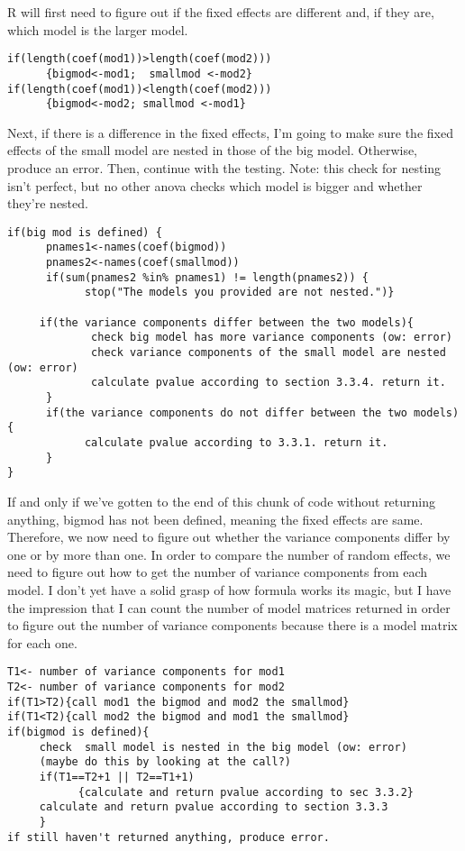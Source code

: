 \documentclass{article}
\begin{document}
 R will first need to figure out if the fixed effects are different and, if they are, which model is the larger model.
\begin{verbatim}
if(length(coef(mod1))>length(coef(mod2)))
      {bigmod<-mod1;  smallmod <-mod2} 
if(length(coef(mod1))<length(coef(mod2)))
      {bigmod<-mod2; smallmod <-mod1}
\end{verbatim}
Next, if there is a difference in the fixed effects, I'm going to make sure the fixed effects of the small model are nested in those of the big model. Otherwise, produce an error. Then, continue with the testing. Note: this check for nesting isn't perfect, but no other anova checks which model is bigger and whether they're nested.
\begin{verbatim}
if(big mod is defined) {
      pnames1<-names(coef(bigmod))
      pnames2<-names(coef(smallmod))
      if(sum(pnames2 %in% pnames1) != length(pnames2)) {
            stop("The models you provided are not nested.")}

     if(the variance components differ between the two models){
             check big model has more variance components (ow: error)
             check variance components of the small model are nested (ow: error)
             calculate pvalue according to section 3.3.4. return it.
      }
      if(the variance components do not differ between the two models){
            calculate pvalue according to 3.3.1. return it.
      }
}
\end{verbatim}
If and only if we've gotten to the end of this chunk of code without returning anything, bigmod has not been defined, meaning the fixed effects are same. Therefore, we now need to figure out whether the variance components differ by one or by more than one. In order to compare the number of random effects, we need to figure out how to get the number of variance components from each model. I  don't yet have a solid grasp of how formula works its magic, but I have the impression that I can count the number of model matrices returned in order to figure out the number of variance components because there is a model matrix for each one.

\begin{verbatim}
T1<- number of variance components for mod1
T2<- number of variance components for mod2
if(T1>T2){call mod1 the bigmod and mod2 the smallmod}
if(T1<T2){call mod2 the bigmod and mod1 the smallmod}
if(bigmod is defined){
     check  small model is nested in the big model (ow: error)
     (maybe do this by looking at the call?)
     if(T1==T2+1 || T2==T1+1) 
           {calculate and return pvalue according to sec 3.3.2}     
     calculate and return pvalue according to section 3.3.3
     }
if still haven't returned anything, produce error.     
\end{verbatim}	
\end{document}
